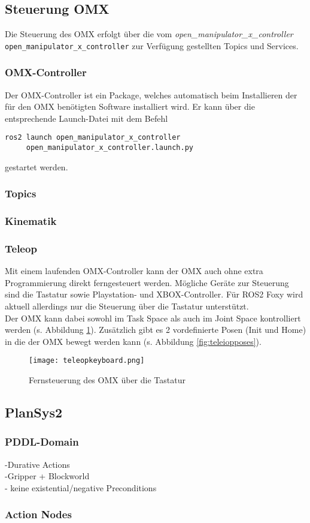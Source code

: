 \subsection{Steuerung OMX}
Die Steuerung des OMX erfolgt über die vom \emph{open\_manipulator\_x\_controller}\\ \verb|open_manipulator_x_controller| zur Verfügung gestellten Topics und Services.
\subsubsection{OMX-Controller}
Der OMX-Controller ist ein Package, welches automatisch beim Installieren der für den OMX benötigten Software installiert wird. Er kann über die entsprechende Launch-Datei mit dem Befehl
\begin{verbatim}
ros2 launch open_manipulator_x_controller 
     open_manipulator_x_controller.launch.py
\end{verbatim}
gestartet werden.
\subsubsection{Topics}
\subsubsection{Kinematik}
\subsubsection{Teleop} \label{teleop}
Mit einem laufenden OMX-Controller kann der OMX auch ohne extra Programmierung direkt ferngesteuert werden. Mögliche Geräte zur Steuerung sind die Tastatur sowie Playstation- und XBOX-Controller. Für \ac{ROS2} Foxy wird aktuell allerdings nur die Steuerung über die Tastatur unterstützt.\\
Der OMX kann dabei sowohl im Task Space als auch im Joint Space kontrolliert werden (s. Abbildung \ref{fig:teleopkeyboard}). Zusätzlich gibt es 2 vordefinierte Posen (Init und Home) in die der OMX bewegt werden kann (s. Abbildung \ref{fig:teleiopposes}).
\begin{figure}[ht!]
\centering
\texttt{[image: teleopkeyboard.png]}
\caption{Fernsteuerung des OMX über die Tastatur}
\label{fig:teleopkeyboard}
\end{figure}
\subsection{PlanSys2}
\cite{plansys}
\subsubsection{PDDL-Domain}
-Durative Actions\\
-Gripper + Blockworld\\
- keine existential/negative Preconditions\\
\subsubsection{Action Nodes}

